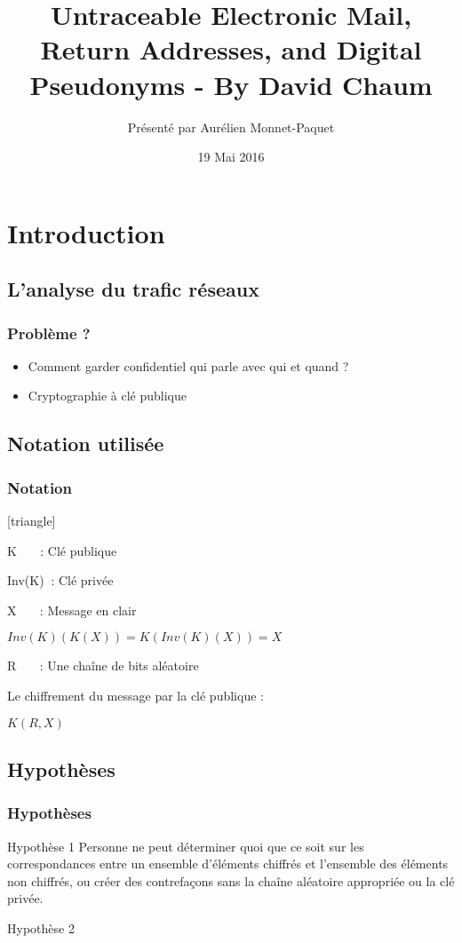\documentclass{beamer}
\title{Untraceable Electronic Mail, Return Addresses, and Digital Pseudonyms - By David Chaum}
\author{Présenté par Aurélien Monnet-Paquet}
\institute{www.inria.fr}
\date{19 Mai 2016}
\begin{document}
\begin{frame}
\titlepage
\end{frame}

\section{Introduction}
\subsection{L'analyse du trafic réseaux}
\begin{frame}
\frametitle{Problème ?}
\begin{itemize}
[triangle]
\item Comment garder confidentiel qui parle avec qui et quand ?
\pause
\item Cryptographie à clé publique
\end{itemize}
\end{frame}

\subsection{Notation utilisée}
\begin{frame}
\frametitle{Notation}
\begin{itemize}
[triangle]
\item K $~~~~~~~$: Clé publique
\item Inv(K) $~$: Clé privée
\item X $~~~~~~~$: Message en clair
\pause
\item $Inv(K)( K( X ) ) = K( Inv(K)( X ) ) = X$
\pause
\item R $~~~~~~~$: Une chaîne de bits aléatoire
\pause
\item Le chiffrement du message par la clé publique :
\begin{center}
\item $K( R, X )$
\end{center}
\end{itemize}
\end{frame}

\subsection{Hypothèses}
\begin{frame}
\frametitle{Hypothèses}
\begin{block}{Hypothèse 1}
Personne ne peut déterminer quoi que ce soit sur les correspondances entre un ensemble d'éléments chiffrés et l'ensemble des éléments non chiffrés, ou créer des contrefaçons sans la chaîne aléatoire appropriée ou la clé privée.
\end{block}

\begin{block}{}
Hypothèse 2
\end{block}

\end{frame}
\end{document}
